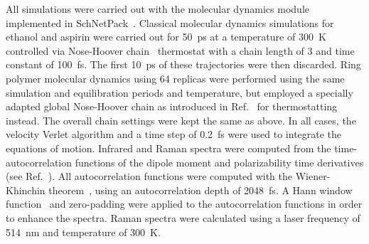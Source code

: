 \documentclass[reprint,
amsmath,amssymb,
 aip,jcp
]{revtex4-2}
\begin{document}
All simulations were carried out with the molecular dynamics module implemented in SchNetPack~\cite{schutt2018schnet}.
Classical molecular dynamics simulations for ethanol and aspirin were carried out for 50~ps at a temperature of 300~K controlled via Nose-Hoover chain~\cite{martyna1992nhc} thermostat with a chain length of 3 and time constant of 100~fs. The first 10~ps of these trajectories were then discarded.
Ring polymer molecular dynamics using 64 replicas were performed using the same simulation and equilibration periods and temperature, but employed a specially adapted global Nose-Hoover chain as introduced in Ref.~\cite{ceriotti2010stochastic} for thermostatting instead.
The overall chain settings were kept the same as above.
In all cases, the velocity Verlet algorithm and a time step of 0.2~fs were used to integrate the equations of motion.
Infrared and Raman spectra were computed from the time-autocorrelation functions of the dipole moment and polarizability time derivatives (see Ref.~\cite{thomas2013computing}).
All autocorrelation functions were computed with the Wiener-Khinchin theorem~\cite{wiener1930}, using an autocorrelation depth of 2048~fs.
A Hann window function~\cite{6768513} and zero-padding were applied to the autocorrelation functions in order to enhance the spectra.
Raman spectra were calculated using a laser frequency of 514~nm and temperature of 300~K.
\end{document}
